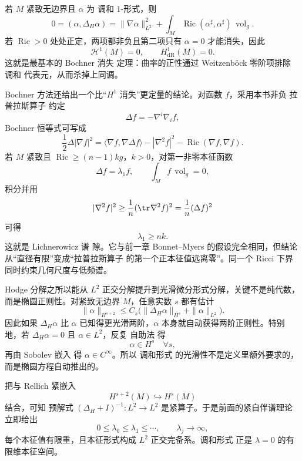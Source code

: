 若 $M$ 紧致无边界且 $\alpha$ 为 调和 $1$-形式，则
\[
0=(\alpha,\Delta_H\alpha)
=\|\nabla\alpha\|_{L^2}^2
+\int_M\operatorname{Ric}(\alpha^\sharp,\alpha^\sharp)\,\operatorname{vol}_g.
\]
若 $\operatorname{Ric}>0$ 处处正定，两项都非负且第二项只有 $\alpha=0$ 才能消失，因此
\[
\mathcal H^1(M)=0,
\qquad
H^1_{\mathrm{dR}}(M)=0.
\]
这就是最基本的 Bochner 消失 定理：曲率的正性通过 Weitzenböck 零阶项排除 调和 代表元，从而杀掉上同调。

Bochner 方法还给出一个比“$H^1$ 消失”更定量的结论。对函数 $f$，采用本书非负 拉普拉斯算子 约定
\[
\Delta f=-\nabla^i\nabla_i f,
\]
Bochner 恒等式可写成
\begin{equation}
\frac12\Delta|\nabla f|^2
=\langle\nabla f,\nabla\Delta f\rangle
-|\nabla^2f|^2
-\operatorname{Ric}(\nabla f,\nabla f).
\label{eq:math-dg-bochner-function}
\end{equation}
若 $M$ 紧致且 $\operatorname{Ric}\ge(n-1)k g$，$k>0$，对第一非零本征函数
\[
\Delta f=\lambda_1 f,
\qquad
\int_M f\,\operatorname{vol}_g=0,
\]
积分并用
\[
|\nabla^2 f|^2\ge\frac1n(\tr\nabla^2f)^2
=\frac1n(\Delta f)^2
\]
可得
\begin{equation}
{\lambda_1\ge nk.}
\label{eq:math-dg-lichnerowicz-gap}
\end{equation}
这就是 Lichnerowicz 谱 隙。它与前一章 Bonnet--Myers 的假设完全相同，但结论从“直径有限”变成“拉普拉斯算子 的第一个正本征值远离零”。同一个 Ricci 下界同时约束几何尺度与低频谱。

Hodge 分解之所以能从 $L^2$ 正交分解提升到光滑微分形式分解，关键不是纯代数，而是椭圆正则性。对紧致无边界 $M$，任意实数 $s$ 都有估计
\begin{equation}
{
\|\alpha\|_{H^{s+2}}
\le C_s\bigl(
\|\Delta_H\alpha\|_{H^s}
+\|\alpha\|_{L^2}
\bigr)
}.
\label{eq:math-dg-hodge-elliptic-estimate}
\end{equation}
因此如果 $\Delta_H\alpha$ 比 $\alpha$ 已知得更光滑两阶，$\alpha$ 本身就自动获得两阶正则性。特别地，若 $\Delta_H\alpha=0$ 且 $\alpha\in L^2$，反复 自助法 得
\[
\alpha\in H^s\quad\forall s,
\]
再由 Sobolev 嵌入 得 $\alpha\in C^\infty$。所以 调和形式 的光滑性不是定义里额外要求的，而是椭圆方程自动推出的。

把与 Rellich 紧嵌入
\[
H^{s+2}(M)\hookrightarrow H^s(M)
\]
结合，可知 预解式 $(\Delta_H+I)^{-1}:L^2\to L^2$ 是紧算子。于是前面的紧自伴谱理论立即给出
\[
0\le\lambda_0\le\lambda_1\le\cdots,
\qquad
\lambda_j\to\infty,
\]
每个本征值有限重，且本征形式构成 $L^2$ 正交完备系。调和形式 正是 $\lambda=0$ 的有限维本征空间。

